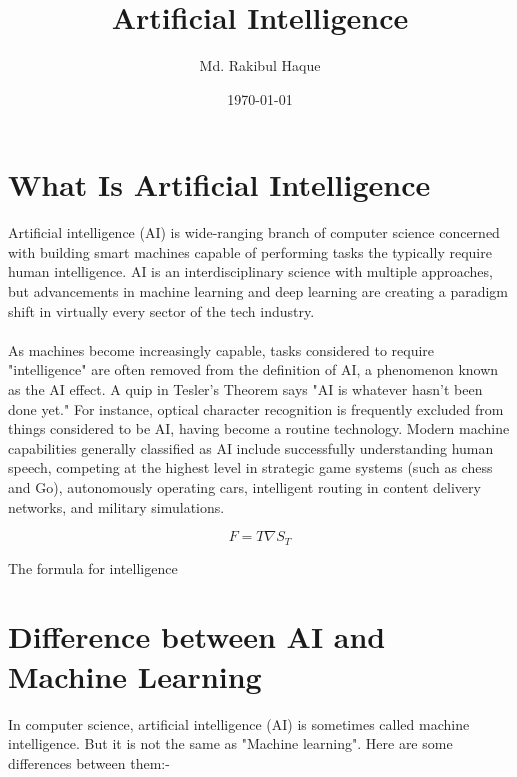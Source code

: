 \documentclass[a4paper, 12pt]{article}
\begin{document}
\title{\Large{\textbf{Artificial Intelligence}}}
\author{Md. Rakibul Haque}
\date{\today}
\maketitle

\tableofcontents

\section{What Is Artificial Intelligence}
Artificial intelligence (AI) is wide-ranging branch of computer science concerned with building smart machines capable of performing tasks the typically require human intelligence. AI is an interdisciplinary science with multiple approaches, but advancements in machine learning and deep learning are creating a paradigm shift in virtually every sector of the tech industry.\\ \\
As machines become increasingly capable, tasks considered to require "intelligence" are often removed from the definition of AI, a phenomenon known as the AI effect. A quip in Tesler's Theorem says "AI is whatever hasn't been done yet." For instance, optical character recognition is frequently excluded from things considered to be AI, having become a routine technology. Modern machine capabilities generally classified as AI include successfully understanding human speech, competing at the highest level in strategic game systems (such as chess and Go), autonomously operating cars, intelligent routing in content delivery networks, and military simulations.

$$F = T \nabla S_T$$
\begin{center} The formula for intelligence \end{center}

\section{Difference between AI and Machine Learning}
In computer science, artificial intelligence (AI) is sometimes called machine intelligence. But it is not the same as "Machine learning". Here are some differences between them:-
\end{document}
